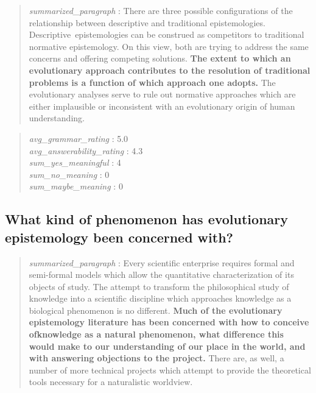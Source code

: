 \begin{quote}
\emph{summarized\_paragraph} : There are three possible configurations
of the relationship between descriptive and traditional epistemologies.
Descriptive~epistemologies can be construed as competitors to
traditional normative epistemology. On this view, both are trying to
address the same concerns and offering competing solutions. \textbf{The
extent to which an evolutionary approach contributes to the resolution
of traditional problems is a function of which approach one adopts.} The
evolutionary analyses serve to rule out normative approaches which are
either implausible or inconsistent with an evolutionary origin of human
understanding.
\end{quote}

\begin{quote}
\emph{avg\_grammar\_rating} : 5.0\\
\emph{avg\_answerability\_rating} : 4.3\\
\emph{sum\_yes\_meaningful} : 4\\
\emph{sum\_no\_meaning} : 0\\
\emph{sum\_maybe\_meaning} : 0
\end{quote}

\hypertarget{what-kind-of-phenomenon-has-evolutionary-epistemology-been-concerned-with}{%
\subsection{What kind of phenomenon has evolutionary epistemology been
concerned
with?}\label{what-kind-of-phenomenon-has-evolutionary-epistemology-been-concerned-with}}

\begin{quote}
\emph{summarized\_paragraph} : Every scientific enterprise requires
formal and semi-formal models which allow the quantitative
characterization of its objects of study. The attempt to transform the
philosophical study of knowledge into a scientific discipline which
approaches knowledge as a biological phenomenon is no different.
\textbf{Much of the evolutionary epistemology literature has been
concerned with how to conceive ofknowledge as a natural phenomenon, what
difference this would make to our understanding of our place in the
world, and with answering objections to the project.} There are, as
well, a number of more technical projects which attempt to provide the
theoretical tools necessary for a naturalistic worldview.
\end{quote}


